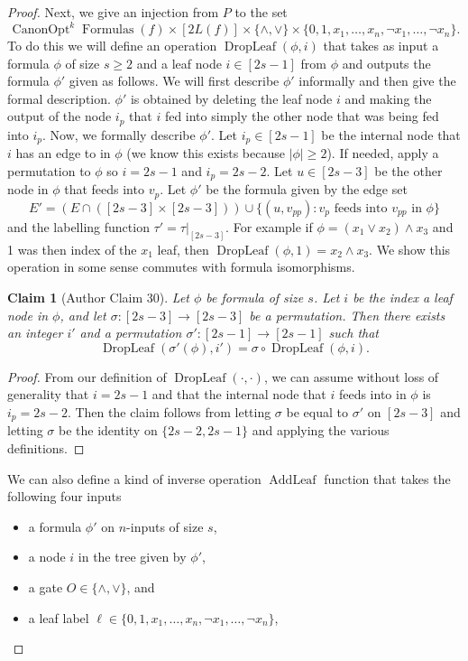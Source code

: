 \documentclass[10pt,a4paper]{article}
\newtheorem{ntclaim}[nttheorem]{Claim}
\newcommand{\Canon}[1]{\operatorname{CanonOpt}^{#1}\!\operatorname{Formulas}}
\newcommand{\DropLeaf}{\operatorname{DropLeaf}}
\newcommand{\AddLeaf}{\operatorname{AddLeaf}}
\begin{document}
\begin{proof}
Next, we give an injection from $P$ to the set
\[\Canon{k}(f)\times[2L(f)]\times\{\land,\lor\}\times\{0,1,x_1,\ldots,x_n,\neg x_1,\ldots,\neg x_n\}.\]
To do this we will define an operation $\DropLeaf(\phi,i)$ that takes as input a formula $\phi$ of size $s\geq 2$ and a leaf node $i\in[2s-1]$ from $\phi$ and outputs the formula $\phi'$ given as follows. We will first describe $\phi'$ informally and then give the formal description. $\phi'$ is obtained by deleting the leaf node $i$ and making the output of the node $i_p$ that $i$ fed into simply the other node that was being fed into $i_p$.
Now, we formally describe $\phi'$. Let $i_p\in[2s-1]$ be the internal node that $i$ has an edge to in $\phi$ (we know this exists because $|\phi|\geq 2$). If needed, apply a permutation to $\phi$ so $i=2s-1$ and $i_p=2s-2$. Let $u\in[2s-3]$ be the other node in $\phi$ that feeds into $v_p$. Let $\phi'$ be the formula given by the edge set
\[E'=(E\cap([2s-3]\times[2s-3]))\cup\{(u,v_{pp}):v_p\text{ feeds into }v_{pp}\text{ in }\phi\}\]
and the labelling function $\tau'=\tau|_{[2s-3]}$.
For example if $\phi=(x_1\lor x_2)\land x_3$ and 1 was then index of the $x_1$ leaf, then $\DropLeaf(\phi,1)=x_2\land x_3$.
We show this operation in some sense commutes with formula isomorphisms.
\begin{ntclaim}[Author Claim 30]
Let $\phi$ be formula of size $s$. Let $i$ be the index a leaf node in $\phi$, and let $\sigma:[2s-3]\to[2s-3]$ be a permutation. Then there exists an integer $i'$ and a permutation $\sigma':[2s-1]\to[2s-1]$ such that
\[\DropLeaf(\sigma'(\phi),i')=\sigma\circ\DropLeaf(\phi,i).\]
\end{ntclaim}
\begin{proof}
From our definition of $\DropLeaf(\cdot,\cdot)$, we can assume without loss of generality that $i=2s-1$ and that the internal node that $i$ feeds into in $\phi$ is $i_p=2s-2$.
Then the claim follows from letting $\sigma$ be equal to $\sigma'$ on $[2s-3]$ and letting $\sigma$ be the identity on $\{2s-2,2s-1\}$ and applying the various definitions.
\end{proof}
We can also define a kind of inverse operation $\AddLeaf$ function that takes the following four inputs
\begin{itemize}
\item a formula $\phi'$ on $n$-inputs of size $s$,
\item a node $i$ in the tree given by $\phi'$,
\item a gate $O\in\{\land,\lor\}$, and
\item a leaf label $\ell\in\{0,1,x_1,\ldots,x_n,\neg x_1,\ldots,\neg x_n\}$,

\end{itemize}
\end{proof}
\end{document}
